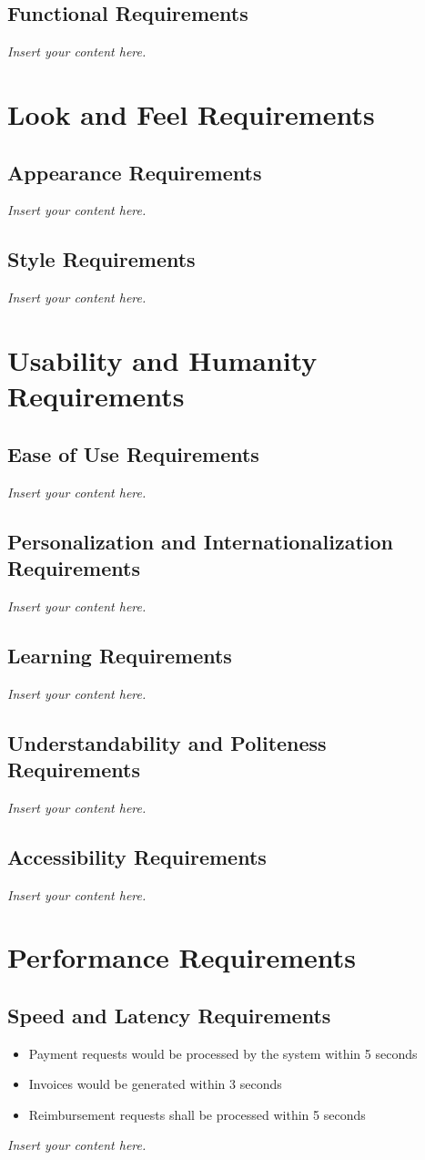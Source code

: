 \documentclass[12pt]{article}
\newcommand{\lips}{\textit{Insert your content here.}}
\begin{document}
\subsection{Functional Requirements}
\lips

\section{Look and Feel Requirements}
\subsection{Appearance Requirements}
\lips
\subsection{Style Requirements}
\lips

\section{Usability and Humanity Requirements}
\subsection{Ease of Use Requirements}
\lips
\subsection{Personalization and Internationalization Requirements}
\lips
\subsection{Learning Requirements}
\lips
\subsection{Understandability and Politeness Requirements}
\lips
\subsection{Accessibility Requirements}
\lips

\section{Performance Requirements}
\subsection{Speed and Latency Requirements}
\begin{itemize}
    \item Payment requests would be processed by the system within 5 seconds
    \item Invoices would be generated within 3 seconds
    \item Reimbursement requests shall be processed within 5 seconds
\end{itemize}
\lips
\end{document}
